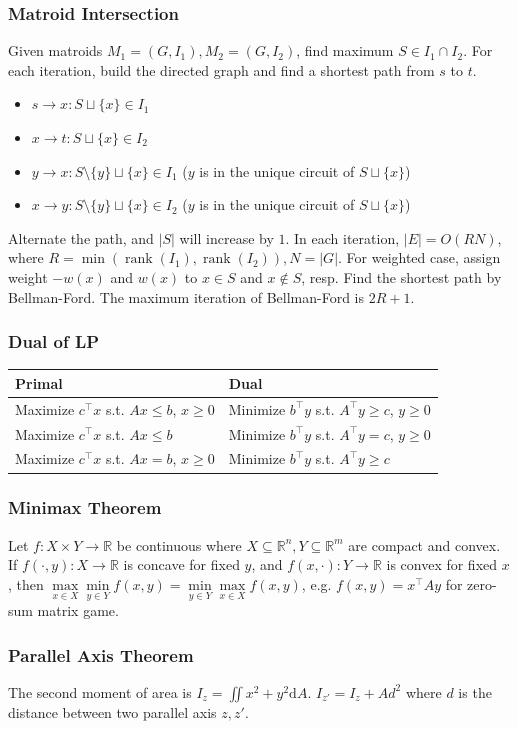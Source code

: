 \subsubsection{Matroid Intersection}
Given matroids \(M_1=(G,I_1),M_2=(G,I_2)\), find maximum \(S\in I_1\cap I_2\).
For each iteration, build the directed graph and find a shortest path from \(s\) to \(t\).
\begin{itemize}
    \item \(s \to x: S \sqcup \{x\} \in I_1\)
    \item \(x \to t: S \sqcup \{x\} \in I_2\)
    \item \(y \to x: S \setminus \{y\} \sqcup \{x\} \in I_1\) (\(y\) is in the unique circuit of \(S \sqcup \{x\}\))
    \item \(x \to y: S \setminus \{y\} \sqcup \{x\} \in I_2\) (\(y\) is in the unique circuit of \(S \sqcup \{x\}\))
\end{itemize}
Alternate the path, and \(|S|\) will increase by \(1\).
In each iteration, \(|E| = O(RN)\), where
\(R = \min(\operatorname{rank}(I_1), \operatorname{rank}(I_2)), N = |G|\).
For weighted case, assign weight \(-w(x)\) and \(w(x)\) to \(x\in S\) and \(x\notin S\), resp.
Find the shortest path by Bellman-Ford.
The maximum iteration of Bellman-Ford is \(2R+1\).

\subsubsection{Dual of LP}

\begin{tabular}{|l|l|}
\hline
\textbf{Primal} & \textbf{Dual} \\
\hline
Maximize $c^\intercal x$ s.t. $Ax \leq b$, $x \geq 0$ & Minimize $b^\intercal y$ s.t. $A^\intercal y \geq c$, $y \geq 0$ \\
\hline
Maximize $c^\intercal x$ s.t. $Ax \leq b$ & Minimize $b^\intercal y$ s.t. $A^\intercal y = c$, $y \geq 0$ \\
\hline
Maximize $c^\intercal x$ s.t. $Ax = b$, $x \geq 0$ & Minimize $b^\intercal y$ s.t. $A^\intercal y \geq c$ \\
\hline
\end{tabular}

\subsubsection{Minimax Theorem}
Let $f : X \times Y \to \mathbb R$ be continuous where $X \subseteq \mathbb R ^ n, Y \subseteq \mathbb R ^ m$ are compact and convex.
If $f(\cdot, y) : X \to \mathbb R$ is concave for fixed $y$, and
$f(x, \cdot) : Y \to \mathbb R$ is convex for fixed $x$,
then
$
\max\limits _{x\in X}\min\limits _{y\in Y}f(x,y)=\min\limits _{y\in Y}\max\limits _{x\in X}f(x,y)
$,
e.g. $f(x, y) = x^\intercal A y$ for zero-sum matrix game.

\subsubsection{Parallel Axis Theorem}
The second moment of area is $I_z = \iint x^2+y^2 \mathrm{d}A$.
$I_{z'} = I_z + Ad^2$ where $d$ is the distance between two parallel axis $z, z'$.
